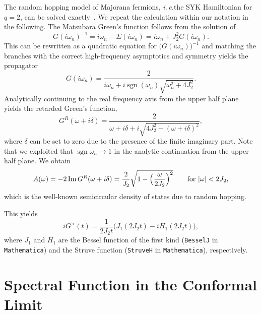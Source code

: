 \documentclass[prx,aps,onecolumn,amsfonts,showpacs,superscriptaddress,preprint,eqsecnum]
{revtex4-1}
\newcommand{\ie}{\textit{i.\,e.}}
\begin{document}
The random hopping model of Majorana fermions, \ie the SYK Hamiltonian for $q 
= 2$, can be solved exactly~\cite{Maldacena2016}. We repeat the calculation 
within our notation in the following. The Matsubara Green's function follows 
from the solution of
\begin{equation}
	G(i\omega_n)^{-1} = i\omega_n - \Sigma(i\omega_n) = i\omega_n + J_2^2 
G(i\omega_n).
\end{equation}
This can be rewritten as a quadratic equation for 
$\bigl(G(i\omega_n)\bigr)^{-1}$ and matching the branches with the correct 
high-frequency asymptotics and symmetry yields the propagator
\begin{equation}
	G(i\omega_n) = \frac{2}{i\omega_n + i \operatorname{sgn}(\omega_n) 
\sqrt{\omega_n^2 + 4 J_2^2}}.
\end{equation}
Analytically continuing to the real frequency axis from the upper half plane 
yields the retarded Green's function,
\begin{equation}
	G^R(\omega+i\delta) = \frac{2}{\omega+i\delta+i\sqrt{4J_2^2 - (\omega 
+i\delta)^2}},
\end{equation}
where $\delta$ can be set to zero due to the presence of the finite imaginary 
part. Note that we exploited that $\operatorname{sgn}\omega_n \rightarrow 1$ in 
the analytic continuation from the upper half plane. We obtain
\begin{equation}
	A(\omega) = -2 \operatorname{Im} G^R(\omega+i\delta) = 
\frac{2}{J_2}\sqrt{1 - \Bigl(\frac{\omega}{2J_2}\Bigr)^2}\qquad \text{for } 
|\omega| < 2 J_2,
\label{eq:A_q2}
\end{equation}
which is the well-known semicircular density of states due to random hopping.

 This yields
\begin{equation}
	i G^>(t) = \frac{1}{2J_2 t} \bigl(J_1(2 J_2 t) - i H_1(2 J_2 t)\bigr),
	\label{eq:Ggtr_q2}
\end{equation}
where $J_1$ and $H_1$ are the Bessel function of the first kind (\verb!BesselJ! 
in \verb!Mathematica!) and the Struve function (\verb!StruveH! in 
\verb!Mathematica!), respectively.

\section{Spectral Function in the Conformal Limit}
\label{app:conformal}
\end{document}

